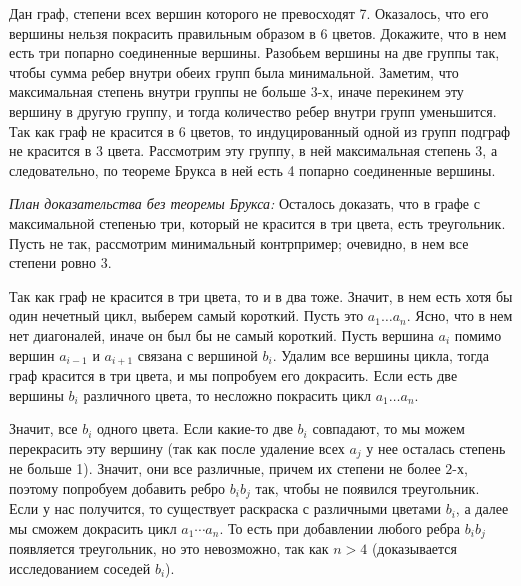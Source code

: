 \problem{}
Дан граф, степени всех вершин которого не превосходят 7.
Оказалось, что его вершины нельзя покрасить правильным образом в 6 цветов.
Докажите, что в нем есть три попарно соединенные вершины.
\solution
Разобьем вершины на две группы так, чтобы сумма ребер внутри обеих групп была
минимальной.
Заметим, что максимальная степень внутри группы не больше 3-х, иначе перекинем
эту вершину в другую группу, и тогда количество ребер внутри групп уменьшится. 
Так как граф не красится в 6 цветов, то индуцированный одной из групп подграф
не красится в 3 цвета. 
Рассмотрим эту группу, в ней максимальная степень 3, а следовательно, по
теореме Брукса в ней есть 4 попарно соединенные вершины.
\par
\emph{План доказательства без теоремы Брукса:}
Осталось доказать, что в графе с максимальной степенью три, который не красится
в три цвета, есть треугольник.
Пусть не так, рассмотрим минимальный контрпример;
очевидно, в нем все степени ровно 3.
\par
Так как граф не красится в три цвета, то и в два тоже.
Значит, в нем есть хотя бы один нечетный цикл, выберем самый короткий.
Пусть это $a_1 \ldots a_n$.
Ясно, что в нем нет диагоналей, иначе он был бы не самый короткий.
Пусть вершина $a_i$ помимо вершин $a_{i-1}$ и $a_{i+1}$ связана с вершиной
$b_i$. Удалим все вершины цикла, тогда граф красится в три цвета, и мы
попробуем его докрасить.
Если есть две вершины $b_i$ различного цвета, то несложно покрасить цикл
$a_1 \ldots a_n$.
\par
Значит, все $b_i$ одного цвета.
Если какие-то две $b_i$ совпадают, то мы можем перекрасить эту вершину
(так как после удаление всех $a_j$ у нее осталась степень не больше 1).
Значит, они все различные, причем их степени не более $2$-х, поэтому попробуем
добавить ребро $b_i b_j$ так, чтобы не появился треугольник.
Если у нас получится, то существует раскраска с различными цветами $b_i$, а
далее мы сможем докрасить цикл $a_1 \cdots a_n$.
То есть при добавлении любого ребра $b_i b_j$ появляется треугольник, но это
невозможно, так как $n > 4$ (доказывается исследованием соседей $b_i$).
\endproblem
